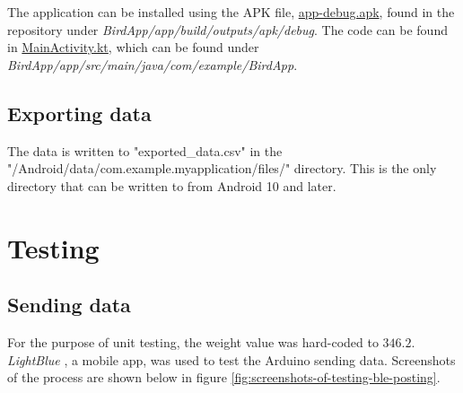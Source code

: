 \documentclass[class=report,11pt,crop=false]{standalone}
\begin{document}
			
			
			
			The application can be installed using the APK file, \href{}{app-debug.apk}, found in the repository under  \textit{BirdApp/app/build/outputs/apk/debug}. The code can be found in \href{https://github.com/karanimaan/EEE4113F-Project--Group-26/blob/main/BirdApp/app/src/main/java/com/example/BirdApp/MainActivity.kt}{MainActivity.kt}, which can be found under \textit{BirdApp/app/src/main/java/com/example/BirdApp}.
		
		
		\subsection{Exporting data}
			
			The data is written to "exported\_data.csv" in the "/Android/data/com.example.myapplication/files/" directory. This is the only directory that can be written to from Android 10 and later.
			
			
			


	\section{Testing}
		
		\subsection{Sending data}
			For the purpose of unit testing, the weight value was hard-coded to $346.2$.
			\textit{LightBlue} \cite{lightblue}, a mobile app, was used to test the Arduino sending data. Screenshots of the process are shown below in figure \ref{fig:screenshots-of-testing-ble-posting}.
			
\end{document}
